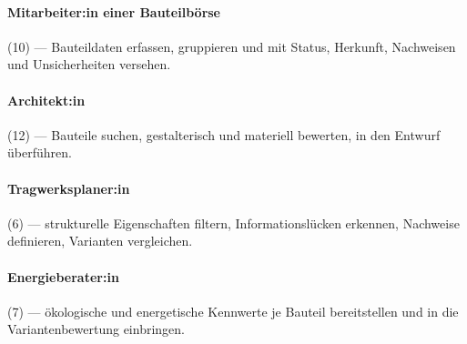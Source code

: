 \documentclass[type=zwischenbericht]{zukunftbau}
\begin{document}
\begin{SemioNest}
\paragraph{Mitarbeiter:in einer Bauteilbörse}
(10) --- Bauteildaten erfassen, gruppieren und mit Status, Herkunft, Nachweisen und Unsicherheiten versehen.

\paragraph{Architekt:in}
(12) --- Bauteile suchen, gestalterisch und materiell bewerten, in den Entwurf überführen.

\paragraph{Tragwerksplaner:in}
(6) --- strukturelle Eigenschaften filtern, Informationslücken erkennen, Nachweise definieren, Varianten vergleichen.

\paragraph{Energieberater:in}
(7) --- ökologische und energetische Kennwerte je Bauteil bereitstellen und in die Variantenbewertung einbringen.
\end{SemioNest}
\end{document}
